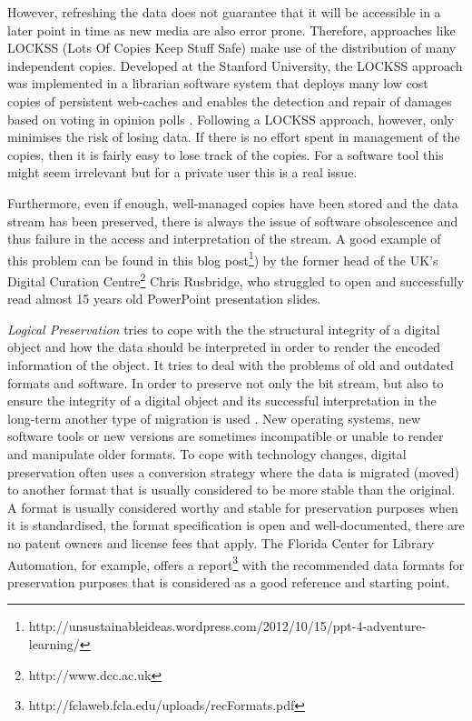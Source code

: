 However, refreshing the data does not guarantee that it will be accessible in a later point in time as new media are also error prone. Therefore, approaches like LOCKSS (Lots Of Copies Keep Stuff Safe) \cite{reich2001lpw} make use of the distribution of many independent copies. Developed at the Stanford University, the LOCKSS approach was implemented in a librarian software system that deploys many low cost copies of persistent web-caches and enables the detection and repair of damages based on voting in opinion polls \cite{Maniatis:2003:PPR:1165389.945451}.
Following a LOCKSS approach, however, only minimises the risk of losing data. If there is no effort spent in management of the copies, then it is fairly easy to lose track of the copies. For a software tool this might seem irrelevant but for a private user this is a real issue.

Furthermore, even if enough, well-managed copies have been stored and the data stream has been preserved, there is always the issue of software obsolescence and thus failure in the access and interpretation of the stream. A good example of this problem can be found in this blog post\footnote{http://unsustainableideas.wordpress.com/2012/10/15/ppt-4-adventure-learning/}) by the former head of the UK's Digital Curation Centre\footnote{http://www.dcc.ac.uk} Chris Rusbridge, who struggled to open and successfully read almost 15 years old PowerPoint presentation slides. \newline

\textit{Logical Preservation} tries to cope with the the structural integrity of a digital object and how the data should be interpreted in order to render the encoded information of the object. It tries to deal with the problems of old and outdated formats and software. In order to preserve not only the bit stream, but also to ensure the integrity of a digital object and its successful interpretation in the long-term another type of migration is used \cite{Lee:2002:SOTADP}. New operating systems, new software tools or new versions are sometimes incompatible or unable to render and manipulate older formats. To cope with technology changes, digital preservation often uses a conversion strategy where the data is migrated (moved) to another format that is usually considered to be more stable than the original. A format is usually considered worthy and stable for preservation purposes when it is standardised, the format specification is open and well-documented, there are no patent owners and license fees that apply. The Florida Center for Library Automation, for example, offers a report\footnote{http://fclaweb.fcla.edu/uploads/recFormats.pdf} with the recommended data formats for preservation purposes that is considered as a good reference and starting point. 

